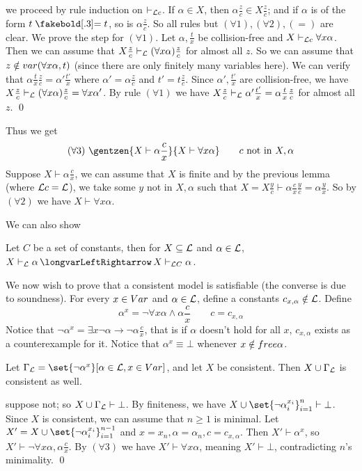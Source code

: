 \elemm

\Proof we proceed by rule induction on $\vdash_{{\cal L}c}$.
If $\alpha\in X$, then $\alpha\frac zc\in X\frac zc$; and if $\alpha$ is of the form $t\eq t$, so is
$\alpha\frac zc$.
So all rules but $(\forall1),(\forall2),(=)$ are clear.
We prove the step for $(\forall1)$.
Let $\alpha,\frac tx$ be collision-free and $X\vdash_{{\cal L}c}\forall x\alpha$.
Then we can assume that $X{{z}\over{c}}\vdash_{{\cal L}}(\forall x\alpha){{z}\over{c}}$ for almost all $z$.
So we can assume that $z\notin{\sl var}(\forall x\alpha,t)$ (since there are only finitely many variables here).
We can verify that $\alpha\frac tx\frac zc=\alpha'\frac{t'}x$ where $\alpha'=\alpha\frac zc$ and $t'=t\frac zc$.
Since $\alpha',\frac{t'}x$ are collision-free, we have $X{{z}\over{c}}\vdash_{{\cal L}}(\forall x\alpha){{z}\over{c}}=\forall x\alpha'$.
By rule $(\forall1)$ we have $X{{z}\over{c}}\vdash_{{\cal L}}\alpha'{{t'}\over{x}}=\alpha{{t}\over{x}}{{z}\over{c}}$ for almost all $z$.
\qed

Thus we get
$$ (\forall3)\ \gentzen{X\vdash\alpha\frac cx}{X\vdash\forall x\alpha}\qquad\hbox{$c$ not in $X,\alpha$} $$
Suppose $X\vdash\alpha\frac cx$, we can assume that $X$ is finite and by the previous lemma (where ${\cal L}c={\cal L}$), we take some
$y$ not in $X,\alpha$ such that $X=X\frac yc\vdash\alpha\frac cx\frac yc=\alpha\frac yx$.
So by $(\forall2)$ we have $X\vdash\forall x\alpha$.

We can also show

\blemm

    Let $C$ be a set of constants, then for $X\subseteq{\cal L}$ and $\alpha\in{\cal L}$, $X\vdash_{\c L}\alpha\iff X\vdash_{\c LC}\alpha$.

\elemm

We now wish to prove that a consistent model is satisfiable (the converse is due to soundness).
For every $x\in{\sl Var}$ and $\alpha\in{\cal L}$, define a constants $c_{x,\alpha}\notin{\cal L}$.
Define
$$ \alpha^x = \neg\forall x\alpha\land\alpha\frac cx\qquad c=c_{x,\alpha} $$
Notice that $\neg\alpha^x=\exists x\neg\alpha\to\neg\alpha\frac cx$, that is if $\alpha$ doesn't hold for all $x$, $c_{x,\alpha}$
exists as a counterexample for it.
Notice that $\alpha^x\equiv\bot$ whenever $x\notin{\sl free}\alpha$.

\blemm

    Let $\Gamma_{\c L}=\set{\neg\alpha^x}[\alpha\in\c L,x\in\Var]$, and let $X$ be consistent.
    Then $X\cup\Gamma_{{\cal L}}$ is consistent as well.

\elemm

\Proof suppose not; so $X\cup\Gamma_{{\cal L}}\vdash\bot$.
By finiteness, we have $X\cup\set{\neg\alpha_i^{x_i}}_{i=1}^n\vdash\bot$.
Since $X$ is consistent, we can assume that $n\geq1$ is minimal.
Let $X'=X\cup\set{\neg\alpha_i^{x_i}}_{i=1}^{n-1}$ and $x=x_n,\alpha=\alpha_n,c=c_{x,\alpha}$.
Then $X'\vdash\alpha^x$, so $X'\vdash\neg\forall x\alpha,\alpha\frac cx$.
By $(\forall3)$ we have $X'\vdash\forall x\alpha$, meaning $X'\vdash\bot$, contradicting $n$'s minimality.
\qed

